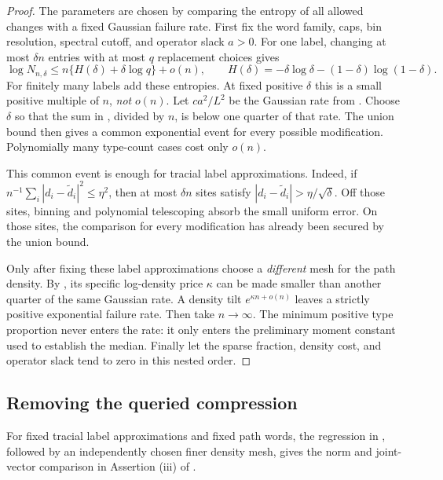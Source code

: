 \begin{proof}
The parameters are chosen by comparing the entropy of all allowed
changes with a fixed Gaussian failure rate.  First fix the word
family, caps, bin resolution, spectral cutoff, and operator slack
$a>0$.  For one label, changing at most $\delta n$ entries with
at most $q$ replacement choices gives
\begin{equation}
 \log N_{n,\delta}
 \le n\{H(\delta)+\delta\log q\}+o(n),
 \qquad
 H(\delta)=-\delta\log\delta-(1-\delta)\log(1-\delta).
 \label{eq:path-sparse-entropy}
\end{equation}
For finitely many labels add these entropies.  At fixed positive
$\delta$ this is a small positive multiple of $n$, \emph{not} $o(n)$.
Let $c a^2/L^2$ be the Gaussian rate from
.  Choose $\delta$ so that the sum in
, divided by $n$, is below one quarter
of that rate.  The union bound then gives a common exponential event
for every possible modification.  Polynomially many type-count cases
cost only $o(n)$.

This common event is enough for tracial label approximations.  Indeed,
if $n^{-1}\sum_i|d_i-\widetilde d_i|^2\le\eta^2$, then at most
$\delta n$ sites satisfy $|d_i-\widetilde d_i|>\eta/\sqrt\delta$.
Off those sites, binning and polynomial telescoping absorb the small
uniform error.  On those sites, the comparison for every modification
has already been secured by the union bound.

Only after fixing these label approximations choose a \emph{different}
mesh for the path density.  By , its specific
log-density price $\kappa$ can be made smaller than another quarter
of the same Gaussian rate.  A density tilt $e^{\kappa n+o(n)}$ leaves
a strictly positive exponential failure rate.  Then take $n\to\infty$.
The minimum positive type proportion never enters the rate: it only
enters the preliminary moment constant used to establish the median.
Finally let the sparse fraction, density cost, and operator slack tend
to zero in this nested order.
\end{proof}

\subsection{Removing the queried compression}

\begin{lemma}
\label{lem:path-compressed}
For fixed tracial label approximations and fixed path words, the
regression in , followed by an independently
chosen finer density mesh, gives the norm and joint-vector comparison
in Assertion \textup{(iii)} of .
\end{lemma}

